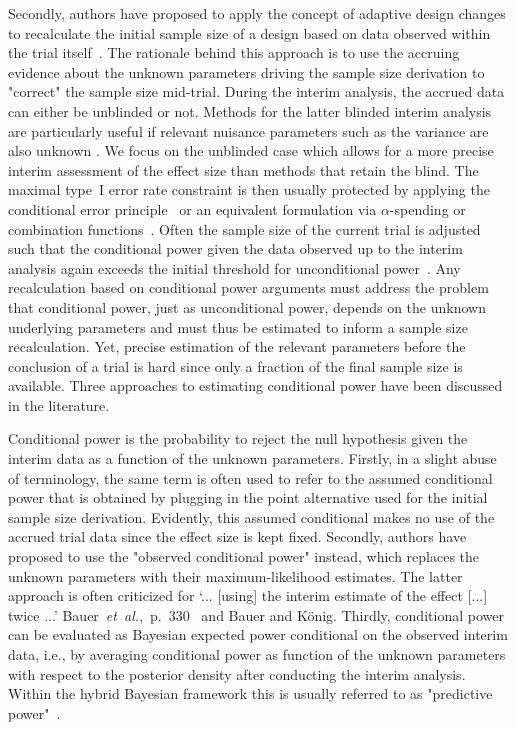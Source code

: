 \documentclass[12pt]{article}
\begin{document}
Secondly, authors have proposed to apply the concept of adaptive design changes
to recalculate the initial sample size of a design based on data observed
within the trial itself~\cite{bauer2016}.
The rationale behind this approach is to use the accruing evidence about the unknown parameters driving the sample size derivation to
"correct" the sample size mid-trial.
During the interim analysis, the accrued data can either be unblinded
or not.
Methods for the latter blinded interim analysis are particularly useful if relevant nuisance parameters such as the variance are also unknown \cite{birkett1994internal,bauer2016}.
We focus on the unblinded case which allows for a more precise
interim assessment of the effect size than methods that retain
the blind.
The maximal type~I error rate constraint is then usually protected by
applying the conditional error principle~\cite{muller2004,brannath2012}
or an equivalent formulation via $\alpha$-spending or
combination functions~\cite{bauer2016}.
Often the sample size of the current
trial is adjusted such that the conditional power given the data observed up to the
interim analysis again exceeds the initial threshold for unconditional
power~\cite{proschan1995}.
Any recalculation based on conditional power arguments must
address the problem that conditional power,
just as unconditional power,
depends on the unknown underlying parameters
and must thus be
estimated to inform a sample size recalculation.
Yet, precise estimation of the relevant parameters before the conclusion of a trial is hard since only a fraction of the final sample size is available.
Three approaches to estimating conditional power have been discussed in the literature.

Conditional power is the probability to reject the null hypothesis given the interim data as a function of the unknown parameters.
Firstly, in a slight abuse of terminology, the same term is often used to refer to
the assumed conditional power that is obtained by plugging in the
point alternative used for the initial sample size derivation.
Evidently, this assumed conditional makes no use of the accrued trial
data since the effect size is kept fixed.
Secondly,
authors have proposed to use the "observed conditional power" instead, which replaces the unknown parameters with their maximum-likelihood estimates.
The latter approach is often criticized for
`... [using] the interim estimate of the effect [...] twice ...' Bauer~\textit{et~al.},~p.~330~\cite{bauer2016} and Bauer and K\"onig\cite{bauer2006}.
Thirdly,
conditional power can be evaluated as Bayesian expected power conditional on the observed interim data,
i.e., by averaging conditional power as function of the unknown
parameters with respect to the posterior density
after conducting the interim analysis.
Within the hybrid Bayesian framework this is usually referred to as
"predictive power"~\cite{spiegelhalter1994,bauer2016}.
\end{document}
